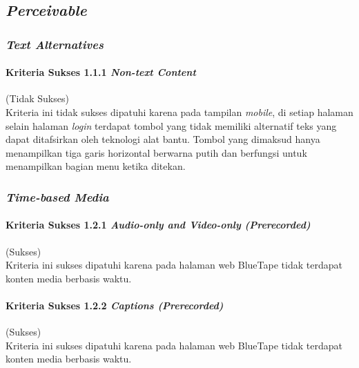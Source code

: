 \subsection{\textit{Perceivable}}
\label{subsec:kepatuhan_bluetape_perceivable}

\subsubsection{\textit{Text Alternatives}}
\label{subsubsec:kepatuhan_bluetape_text_alternatives}

\paragraph{Kriteria Sukses 1.1.1 \textit{Non-text Content}}
\label{par:kepatuhan_bluetape_kriteria_sukses_1.1.1}
(Tidak Sukses)\\

Kriteria ini tidak sukses dipatuhi karena pada tampilan \textit{mobile}, di setiap halaman selain halaman \textit{login} terdapat tombol yang tidak memiliki alternatif teks yang dapat ditafsirkan oleh teknologi alat bantu. Tombol yang dimaksud hanya menampilkan tiga garis horizontal berwarna putih dan berfungsi untuk menampilkan bagian menu ketika ditekan.

\subsubsection{\textit{Time-based Media}}
\label{subsubsec:kepatuhan_bluetape_time_based_media}

\paragraph{Kriteria Sukses 1.2.1 \textit{Audio-only and Video-only (Prerecorded)}}
\label{par:kepatuhan_bluetape_kriteria_sukses_1.2.1}
(Sukses)\\

Kriteria ini sukses dipatuhi karena pada halaman web BlueTape tidak terdapat konten media berbasis waktu.

\paragraph{Kriteria Sukses 1.2.2 \textit{Captions (Prerecorded)}}
\label{par:kepatuhan_bluetape_kriteria_sukses_1.2.2}
(Sukses)\\

Kriteria ini sukses dipatuhi karena pada halaman web BlueTape tidak terdapat konten media berbasis waktu.

